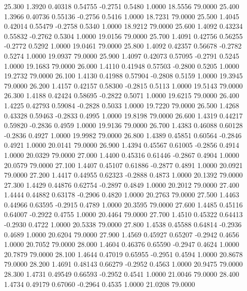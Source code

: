   25.300   1.3920   0.40318   0.54755  -0.2751   0.5480   1.0000  18.5556  79.0000
  25.400   1.3966   0.40736   0.55136  -0.2756   0.5416   1.0000  18.7231  79.0000
  25.500   1.4045   0.42014   0.55479  -0.2758   0.5340   1.0000  18.9212  79.0000
  25.600   1.4092   0.43234   0.55832  -0.2762   0.5304   1.0000  19.0156  79.0000
  25.700   1.4091   0.42756   0.56255  -0.2772   0.5292   1.0000  19.0461  79.0000
  25.800   1.4092   0.42357   0.56678  -0.2782   0.5274   1.0000  19.0937  79.0000
  25.900   1.4097   0.42073   0.57095  -0.2791   0.5245   1.0000  19.1683  79.0000
  26.000   1.4110   0.41948   0.57503  -0.2800   0.5205   1.0000  19.2732  79.0000
  26.100   1.4130   0.41988   0.57904  -0.2808   0.5159   1.0000  19.3945  79.0000
  26.200   1.4157   0.42157   0.58300  -0.2815   0.5113   1.0000  19.5143  79.0000
  26.300   1.4188   0.42424   0.58695  -0.2822   0.5071   1.0000  19.6215  79.0000
  26.400   1.4225   0.42793   0.59084  -0.2828   0.5033   1.0000  19.7220  79.0000
  26.500   1.4268   0.43328   0.59463  -0.2833   0.4995   1.0000  19.8198  79.0000
  26.600   1.4319   0.44217   0.59820  -0.2836   0.4959   1.0000  19.9136  79.0000
  26.700   1.4383   0.46088   0.60128  -0.2836   0.4927   1.0000  19.9982  79.0000
  26.800   1.4389   0.45851   0.60564  -0.2846   0.4921   1.0000  20.0141  79.0000
  26.900   1.4394   0.45567   0.61005  -0.2856   0.4914   1.0000  20.0329  79.0000
  27.000   1.4400   0.45316   0.61446  -0.2867   0.4904   1.0000  20.0579  79.0000
  27.100   1.4407   0.45107   0.61886  -0.2877   0.4891   1.0000  20.0921  79.0000
  27.200   1.4417   0.44955   0.62323  -0.2888   0.4873   1.0000  20.1392  79.0000
  27.300   1.4429   0.44876   0.62754  -0.2897   0.4849   1.0000  20.2012  79.0000
  27.400   1.4444   0.44882   0.63178  -0.2906   0.4820   1.0000  20.2763  79.0000
  27.500   1.4463   0.44966   0.63595  -0.2915   0.4789   1.0000  20.3595  79.0000
  27.600   1.4485   0.45116   0.64007  -0.2922   0.4755   1.0000  20.4464  79.0000
  27.700   1.4510   0.45322   0.64413  -0.2930   0.4722   1.0000  20.5338  79.0000
  27.800   1.4538   0.45588   0.64814  -0.2936   0.4689   1.0000  20.6204  79.0000
  27.900   1.4569   0.45927   0.65207  -0.2942   0.4656   1.0000  20.7052  79.0000
  28.000   1.4604   0.46376   0.65590  -0.2947   0.4624   1.0000  20.7879  79.0000
  28.100   1.4644   0.47019   0.65955  -0.2951   0.4594   1.0000  20.8678  79.0000
  28.200   1.4691   0.48143   0.66279  -0.2952   0.4563   1.0000  20.9475  79.0000
  28.300   1.4731   0.49549   0.66593  -0.2952   0.4541   1.0000  21.0046  79.0000
  28.400   1.4734   0.49179   0.67060  -0.2964   0.4535   1.0000  21.0208  79.0000

